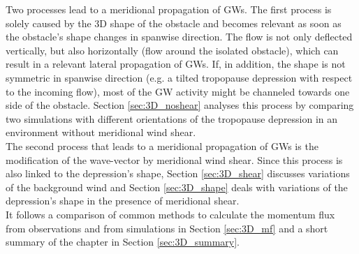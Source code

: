 Two processes lead to a meridional propagation of GWs. The first process is solely caused by the 3D shape of the obstacle and becomes relevant as soon as the obstacle's shape changes in spanwise direction. The flow is not only deflected vertically, but also horizontally (flow around the isolated obstacle), which can result in a relevant lateral propagation of GWs. If, in addition, the shape is not symmetric in spanwise direction (e.g. a tilted tropopause depression with respect to the incoming flow), most of the GW activity might be channeled towards one side of the obstacle. Section \ref{sec:3D_noshear} analyses this process by comparing two simulations with different orientations of the tropopause depression in an environment without meridional wind shear. \\
The second process that leads to a meridional propagation of GWs is the modification of the wave-vector by meridional wind shear. Since this process is also linked to the depression's shape, Section \ref{sec:3D_shear} discusses variations of the background wind and Section \ref{sec:3D_shape} deals with variations of the depression's shape in the presence of meridional shear. \\
It follows a comparison of common methods to calculate the momentum flux from observations and from simulations in Section \ref{sec:3D_mf} and a short summary of the chapter in Section \ref{sec:3D_summary}.


